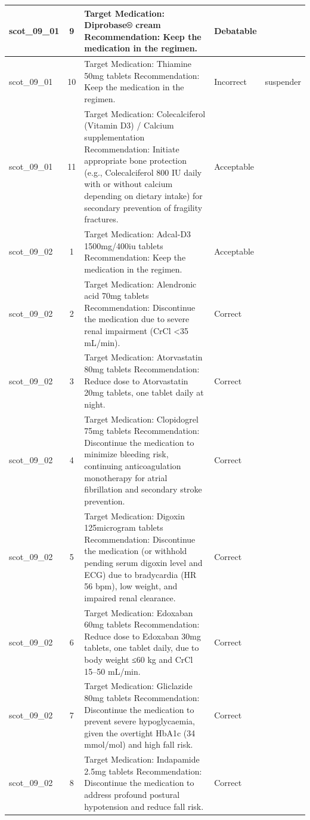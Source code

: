 \begin{longtable}{|p{1.45cm}|c|p{10.2cm}|p{1.55cm}|p{2.3cm}|}
\hline
scot\_09\_01 & 9 & Target Medication: Diprobase® cream Recommendation: Keep the medication in the regimen. & Debatable &  \\
\hline
scot\_09\_01 & 10 & Target Medication: Thiamine 50mg tablets Recommendation: Keep the medication in the regimen. & Incorrect & suspender \\
\hline
scot\_09\_01 & 11 & Target Medication: Colecalciferol (Vitamin D3) / Calcium supplementation Recommendation: Initiate appropriate bone protection (e.g., Colecalciferol 800 IU daily with or without calcium depending on dietary intake) for secondary prevention of fragility fractures. & Acceptable &  \\
\hline
scot\_09\_02 & 1 & Target Medication: Adcal-D3 1500mg/400iu tablets Recommendation: Keep the medication in the regimen. & Acceptable &  \\
\hline
scot\_09\_02 & 2 & Target Medication: Alendronic acid 70mg tablets Recommendation: Discontinue the medication due to severe renal impairment (CrCl <35 mL/min). & Correct &  \\
\hline
scot\_09\_02 & 3 & Target Medication: Atorvastatin 80mg tablets Recommendation: Reduce dose to Atorvastatin 20mg tablets, one tablet daily at night. & Correct &  \\
\hline
scot\_09\_02 & 4 & Target Medication: Clopidogrel 75mg tablets Recommendation: Discontinue the medication to minimize bleeding risk, continuing anticoagulation monotherapy for atrial fibrillation and secondary stroke prevention. & Correct &  \\
\hline
scot\_09\_02 & 5 & Target Medication: Digoxin 125microgram tablets Recommendation: Discontinue the medication (or withhold pending serum digoxin level and ECG) due to bradycardia (HR 56 bpm), low weight, and impaired renal clearance. & Correct &  \\
\hline
scot\_09\_02 & 6 & Target Medication: Edoxaban 60mg tablets Recommendation: Reduce dose to Edoxaban 30mg tablets, one tablet daily, due to body weight ≤60 kg and CrCl 15–50 mL/min. & Correct &  \\
\hline
scot\_09\_02 & 7 & Target Medication: Gliclazide 80mg tablets Recommendation: Discontinue the medication to prevent severe hypoglycaemia, given the overtight HbA1c (34 mmol/mol) and high fall risk. & Correct &  \\
\hline
scot\_09\_02 & 8 & Target Medication: Indapamide 2.5mg tablets Recommendation: Discontinue the medication to address profound postural hypotension and reduce fall risk. & Correct &  \\

\end{longtable}
